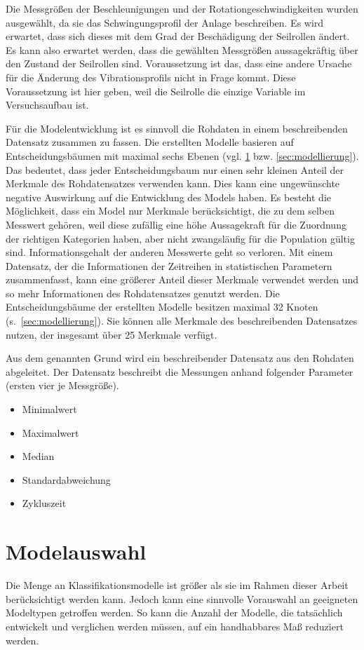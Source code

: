 Die Messgrößen der Beschleunigungen und der Rotationgeschwindigkeiten wurden ausgewählt, da sie das Schwingungsprofil der Anlage beschreiben. Es wird erwartet, dass sich dieses mit dem Grad der Beschädigung der Seilrollen ändert. Es kann also erwartet werden, dass die gewählten Messgrößen aussagekräftig über den Zustand der Seilrollen sind. Voraussetzung ist das, dass eine andere Ursache für die Änderung des Vibrationsprofils nicht in Frage kommt. Diese Voraussetzung ist hier geben, weil die Seilrolle die einzige Variable im Versuchsaufbau ist.

Für die Modelentwicklung ist es sinnvoll die Rohdaten in einem beschreibenden Datensatz zusammen zu fassen. Die erstellten Modelle basieren auf Entscheidungsbäumen mit maximal sechs Ebenen (vgl. \cref{sec:modelauswahl} bzw. \cref{sec:modellierung}). Das bedeutet, dass jeder Entscheidungsbaum nur einen sehr kleinen Anteil der Merkmale des Rohdatensatzes verwenden kann. Dies kann eine ungewünschte negative Auswirkung auf die Entwicklung des Models haben. Es besteht die Möglichkeit, dass ein Model nur Merkmale berücksichtigt, die zu dem selben Messwert gehören, weil diese zufällig eine höhe Aussagekraft für die Zuordnung der richtigen Kategorien haben, aber nicht zwangsläufig für die Population gültig sind. Informationsgehalt der anderen Messwerte geht so verloren. Mit einem Datensatz, der die Informationen der Zeitreihen in statistischen Parametern zusammenfasst, kann eine größerer Anteil dieser Merkmale verwendet werden und so mehr Informationen des Rohdatensatzes genutzt werden. Die Entscheidungsbäume der erstellten Modelle besitzen maximal \num{32} Knoten (s.~\cref{sec:modellierung}). Sie können alle Merkmale des beschreibenden Datensatzes nutzen, der insgesamt über \num{25} Merkmale verfügt.

Aus dem genannten Grund wird ein beschreibender Datensatz aus den Rohdaten abgeleitet. Der Datensatz beschreibt die Messungen anhand folgender Parameter (ersten vier je Messgröße).
\begin{itemize}
	\item Minimalwert
	\item Maximalwert
	\item Median
	\item Standardabweichung
	\item Zykluszeit
\end{itemize}
\section{Modelauswahl}
\label{sec:modelauswahl}
Die Menge an Klassifikationsmodelle ist größer als sie im Rahmen dieser Arbeit berücksichtigt werden kann. Jedoch kann eine sinnvolle Vorauswahl an geeigneten Modeltypen getroffen werden. So kann die Anzahl der Modelle, die tatsächlich entwickelt und verglichen werden müssen, auf ein handhabbares Maß reduziert werden.

